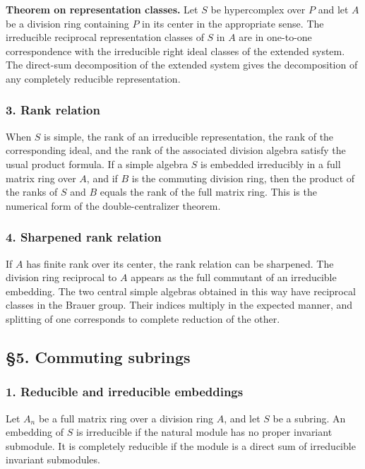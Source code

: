 \documentclass[
  11pt,
]{article}
\begin{document}
\textbf{Theorem on representation classes.} Let \(S\) be hypercomplex
over \(P\) and let \(A\) be a division ring containing \(P\) in its
center in the appropriate sense. The irreducible reciprocal
representation classes of \(S\) in \(A\) are in one-to-one
correspondence with the irreducible right ideal classes of the extended
system. The direct-sum decomposition of the extended system gives the
decomposition of any completely reducible representation.

\subsubsection{3. Rank relation}\label{rank-relation}

When \(S\) is simple, the rank of an irreducible representation, the
rank of the corresponding ideal, and the rank of the associated division
algebra satisfy the usual product formula. If a simple algebra \(S\) is
embedded irreducibly in a full matrix ring over \(A\), and if \(B\) is
the commuting division ring, then the product of the ranks of \(S\) and
\(B\) equals the rank of the full matrix ring. This is the numerical
form of the double-centralizer theorem.

\subsubsection{4. Sharpened rank
relation}\label{sharpened-rank-relation}

If \(A\) has finite rank over its center, the rank relation can be
sharpened. The division ring reciprocal to \(A\) appears as the full
commutant of an irreducible embedding. The two central simple algebras
obtained in this way have reciprocal classes in the Brauer group. Their
indices multiply in the expected manner, and splitting of one
corresponds to complete reduction of the other.

\subsection{§5. Commuting subrings}\label{commuting-subrings}

\subsubsection{1. Reducible and irreducible
embeddings}\label{reducible-and-irreducible-embeddings}

Let \(A_n\) be a full matrix ring over a division ring \(A\), and let
\(S\) be a subring. An embedding of \(S\) is irreducible if the natural
module has no proper invariant submodule. It is completely reducible if
the module is a direct sum of irreducible invariant submodules.
\end{document}
